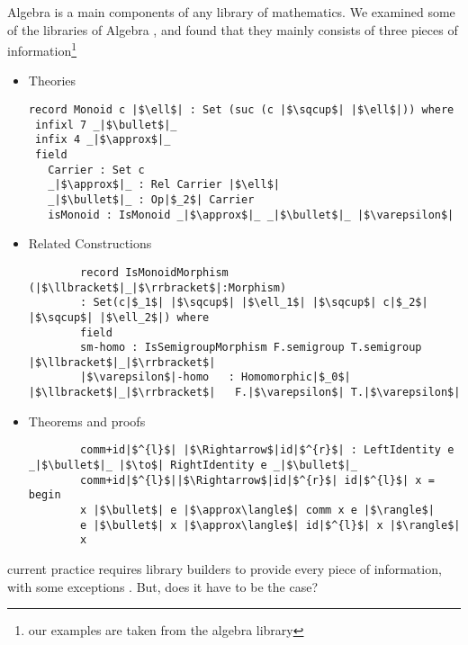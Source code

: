 Algebra is a main components of any library of mathematics. We examined some of the libraries of Algebra , and found that they mainly consists of three pieces of information\footnote{our examples are taken from the algebra library}
\begin{itemize}
    \item Theories 
    \begin{verbatim}
record Monoid c |$\ell$| : Set (suc (c |$\sqcup$| |$\ell$|)) where 
 infixl 7 _|$\bullet$|_
 infix 4 _|$\approx$|_
 field 
   Carrier : Set c 
   _|$\approx$|_ : Rel Carrier |$\ell$| 
   _|$\bullet$|_ : Op|$_2$| Carrier 
   isMonoid : IsMonoid _|$\approx$|_ _|$\bullet$|_ |$\varepsilon$| 
    \end{verbatim}
    \item Related Constructions 
    \begin{verbatim}
        record IsMonoidMorphism (|$\llbracket$|_|$\rrbracket$|:Morphism)
        : Set(c|$_1$| |$\sqcup$| |$\ell_1$| |$\sqcup$| c|$_2$| |$\sqcup$| |$\ell_2$|) where 
        field
        sm-homo : IsSemigroupMorphism F.semigroup T.semigroup |$\llbracket$|_|$\rrbracket$|
        |$\varepsilon$|-homo   : Homomorphic|$_0$| |$\llbracket$|_|$\rrbracket$|   F.|$\varepsilon$| T.|$\varepsilon$|     
    \end{verbatim}
    \item Theorems and proofs 
    \begin{verbatim}
        comm+id|$^{l}$| |$\Rightarrow$|id|$^{r}$| : LeftIdentity e _|$\bullet$|_ |$\to$| RightIdentity e _|$\bullet$|_ 
        comm+id|$^{l}$||$\Rightarrow$|id|$^{r}$| id|$^{l}$| x = begin 
        x |$\bullet$| e |$\approx\langle$| comm x e |$\rangle$|
        e |$\bullet$| x |$\approx\langle$| id|$^{l}$| x |$\rangle$|
        x 
    \end{verbatim}        
\end{itemize}
current practice requires library builders to provide every piece of  information, with some exceptions . But, does it have to be the case? 

